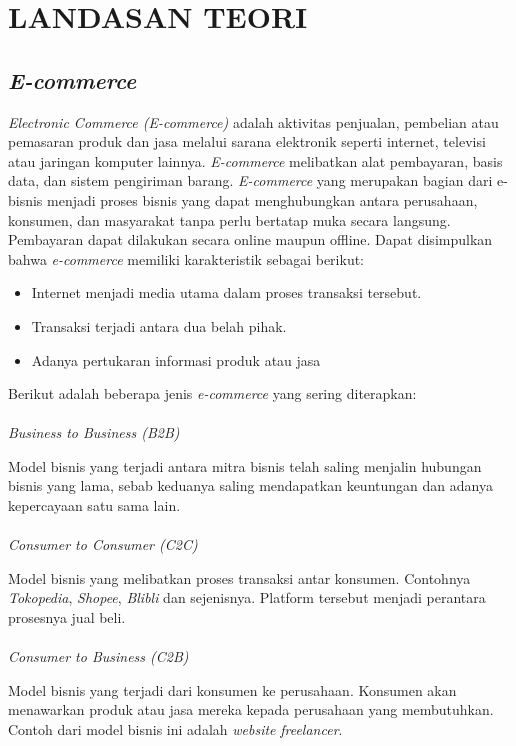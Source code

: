 \chapter{LANDASAN TEORI}
\section{\textit{E-commerce}}
\textit{Electronic Commerce (E-commerce)} adalah aktivitas penjualan, pembelian atau pemasaran produk dan jasa melalui sarana elektronik seperti internet, televisi atau jaringan komputer lainnya. \textit{E-commerce} melibatkan alat pembayaran, basis data, dan sistem pengiriman barang. \textit{E-commerce} yang merupakan bagian dari e-bisnis menjadi proses bisnis yang dapat menghubungkan antara perusahaan, konsumen, dan masyarakat tanpa perlu bertatap muka secara langsung. Pembayaran dapat dilakukan secara online maupun offline. Dapat disimpulkan bahwa \textit{e-commerce} memiliki karakteristik sebagai berikut:
\begin{itemize}
	\item Internet menjadi media utama dalam proses transaksi tersebut.
	\item Transaksi terjadi antara dua belah pihak.
	\item Adanya pertukaran informasi produk atau jasa
\end{itemize}
\par Berikut adalah beberapa jenis \textit{e-commerce} yang sering diterapkan: \\\\
\textit{Business to Business (B2B)}\\
\par Model bisnis yang terjadi antara mitra bisnis telah saling menjalin hubungan bisnis yang lama, sebab keduanya saling mendapatkan keuntungan dan adanya kepercayaan satu sama lain. \\\\
\textit{Consumer to Consumer (C2C)}\\
\par Model bisnis yang melibatkan proses transaksi antar konsumen. Contohnya \textit{Tokopedia}, \textit{Shopee}, \textit{Blibli} dan sejenisnya. Platform tersebut menjadi perantara prosesnya jual beli. \\\\
\textit{Consumer to Business (C2B)}\\
\par Model bisnis yang terjadi dari konsumen ke perusahaan. Konsumen akan menawarkan produk atau jasa mereka kepada perusahaan yang membutuhkan. Contoh dari model bisnis ini adalah \textit{website} \textit{freelancer}.\\


